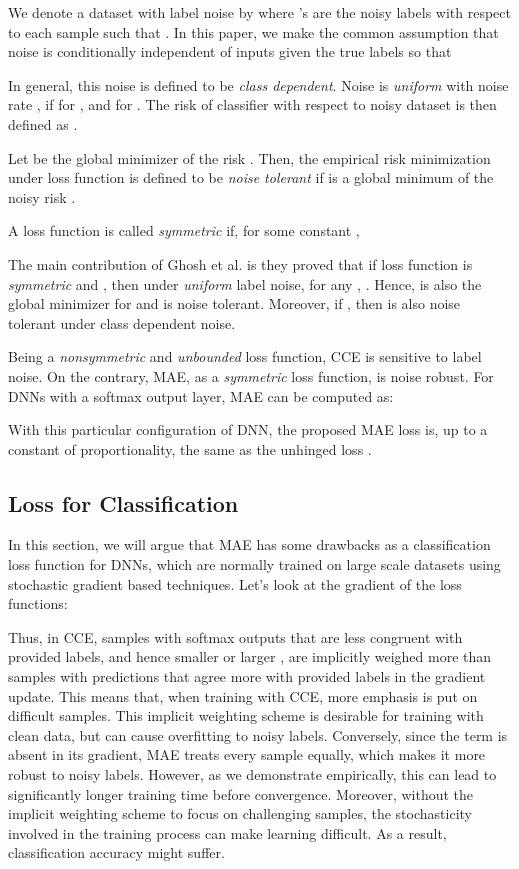 \documentclass{article}
\begin{document}
We denote a dataset with label noise by  where 's are the noisy labels with respect to each sample such that . In this paper, we make the common assumption that noise is conditionally independent of inputs given the true labels so that 

In general, this noise is defined to be \textit{class dependent}. Noise is \textit{uniform} with noise rate , if  for , and  for . The risk of classifier with respect to noisy dataset is then defined as . 

Let  be the global minimizer of the risk . Then, the empirical risk minimization under loss function  is defined to be \textit{noise tolerant} \cite{manwani2013noise} if  is a global minimum of the noisy risk . 

A loss function is called \textit{symmetric} if, for some constant , 

The main contribution of Ghosh et al. \cite{ghosh2015making} is they proved that if loss function is \textit{symmetric} and , then under \textit{uniform} label noise, for any , . Hence,  is also the global minimizer for  and  is noise tolerant. Moreover, if , then  is also noise tolerant under class dependent noise. 

Being a \textit{nonsymmetric} and \textit{unbounded} loss function, CCE is  sensitive to label noise. On the contrary, MAE, as a \textit{symmetric} loss function, is noise robust. 
For DNNs with a softmax output layer, MAE can be computed as:

With this particular configuration of DNN, the proposed MAE loss is, up to a constant of proportionality, the same as the unhinged loss  \cite{van2015learning}. 

\subsection{ Loss for Classification}
In this section, we will argue that MAE has some drawbacks as a classification loss function for DNNs, which are normally trained on large scale datasets using stochastic gradient based techniques. Let's look at the gradient of the loss functions:

Thus, in CCE, samples with softmax outputs that are less congruent with provided labels, and hence smaller  or larger , are implicitly weighed more than samples with predictions that agree more with provided labels in the gradient update. This means that, when training with CCE, more emphasis is put on difficult samples.
This implicit weighting scheme is desirable for training with clean data, but can cause overfitting to noisy labels. 
Conversely, since the  term is absent in its gradient, MAE treats every sample equally, which makes it more robust to noisy labels. 
However, as we demonstrate empirically, this can lead to significantly longer training time before convergence. Moreover, without the implicit weighting scheme to focus on challenging samples, the stochasticity involved in the training process can make learning difficult. 
As a result, classification accuracy might suffer.
\end{document}
